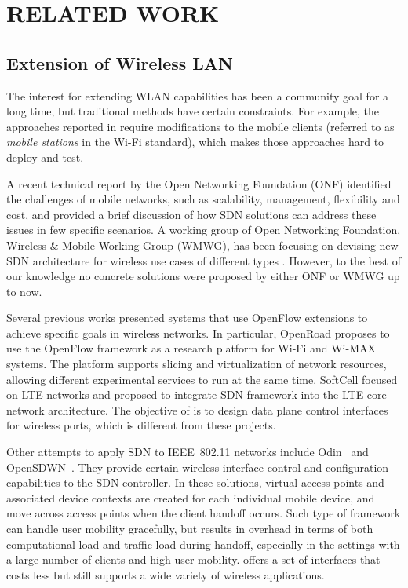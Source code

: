 \chapter{\uppercase {Related Work}}
\label{sec:related}
\section{Extension of Wireless LAN} 
The interest for extending WLAN capabilities has been a community goal for a long time, but traditional methods have certain constraints. For example, the approaches reported in \cite{murty10dyson,shrivastava09centaur} require modifications to the mobile clients (referred to as \emph{mobile stations} in the Wi-Fi standard), which makes those approaches hard to deploy and test.

A recent technical report by the Open Networking Foundation (ONF) \cite{onf13enabled} identified the challenges of mobile  networks, such as scalability, management, flexibility and cost, and provided a brief discussion of how SDN solutions can address these issues in few specific scenarios. A working group of Open Networking Foundation, Wireless \& Mobile Working Group (WMWG), has been focusing on devising new SDN architecture for wireless use cases of different types \cite{onf-wmwg:proposal}. However, to the best of our knowledge no concrete solutions were proposed by either ONF or WMWG up to now.

Several previous works presented systems that use OpenFlow extensions to achieve specific goals in wireless networks. In particular, OpenRoad \cite{yap10openroads, yap10blueprint, yap09stanford} proposes to use the OpenFlow framework as a research platform for Wi-Fi and Wi-MAX systems. The platform supports  slicing and virtualization of network resources, allowing different experimental  services to run at the same time. SoftCell \cite{jin13softcell} focused on LTE networks and proposed to integrate SDN framework into the LTE core network architecture.  The objective of \aetherflow is to design data plane control interfaces for wireless ports, which is different from these projects.

Other attempts to apply SDN to IEEE~802.11 networks include Odin~\cite{suresh12odin} and OpenSDWN~\cite{schulz15opensdwn}. They provide certain wireless interface control and configuration capabilities to the SDN controller. In these solutions, virtual access points and associated device contexts are created for each individual mobile device, and move across access points when the client handoff occurs. Such type of framework can handle user mobility gracefully, but results in overhead in terms of both computational load and traffic load during handoff, especially in the settings with a large number of clients and high user mobility. \aetherflow offers a set of interfaces that costs less but still supports a wide variety of wireless applications.

